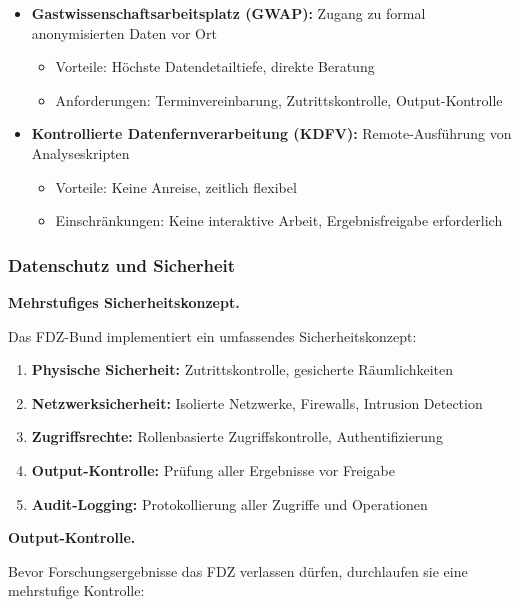 \documentclass[
  german,
  10pt,
  twoside]{article}
\providecommand{\tightlist}{%
  \setlength{\itemsep}{0pt}\setlength{\parskip}{0pt}}
\begin{document}
\begin{itemize}
\tightlist
\item
  \textbf{Gastwissenschaftsarbeitsplatz (GWAP):} Zugang zu formal
  anonymisierten Daten vor Ort

  \begin{itemize}
  \tightlist
  \item
    Vorteile: Höchste Datendetailtiefe, direkte Beratung
  \item
    Anforderungen: Terminvereinbarung, Zutrittskontrolle,
    Output-Kontrolle
  \end{itemize}
\item
  \textbf{Kontrollierte Datenfernverarbeitung (KDFV):} Remote-Ausführung
  von Analyseskripten

  \begin{itemize}
  \tightlist
  \item
    Vorteile: Keine Anreise, zeitlich flexibel
  \item
    Einschränkungen: Keine interaktive Arbeit, Ergebnisfreigabe
    erforderlich
  \end{itemize}
\end{itemize}

\subsubsection{Datenschutz und
Sicherheit}\label{datenschutz-und-sicherheit}

\textbf{Mehrstufiges Sicherheitskonzept.}

Das FDZ-Bund implementiert ein umfassendes Sicherheitskonzept:

\begin{enumerate}
\def\labelenumi{\arabic{enumi}.}
\tightlist
\item
  \textbf{Physische Sicherheit:} Zutrittskontrolle, gesicherte
  Räumlichkeiten
\item
  \textbf{Netzwerksicherheit:} Isolierte Netzwerke, Firewalls, Intrusion
  Detection
\item
  \textbf{Zugriffsrechte:} Rollenbasierte Zugriffskontrolle,
  Authentifizierung
\item
  \textbf{Output-Kontrolle:} Prüfung aller Ergebnisse vor Freigabe
\item
  \textbf{Audit-Logging:} Protokollierung aller Zugriffe und Operationen
\end{enumerate}

\textbf{Output-Kontrolle.}

Bevor Forschungsergebnisse das FDZ verlassen dürfen, durchlaufen sie
eine mehrstufige Kontrolle:
\end{document}
